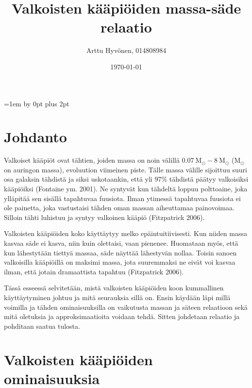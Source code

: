 \documentclass[12pt,a4paper,titlepage]{article}
\title{Valkoisten kääpiöiden massa-säde relaatio}
\author{\begin{tabular}{c}
Arttu Hyvönen, 014808984
\end{tabular}}
\date{\today}
\begin{document}
\maketitle
{}

\restoregeometry

\thispagestyle{empty}
\tableofcontents
\newpage
\setcounter{page}{1}
\parskip=1em \advance\parskip by 0pt plus 2pt
\pagestyle{fancy}


\section{Johdanto}

Valkoiset kääpiöt ovat tähtien, joiden massa on noin välillä $0.07\: \mathrm{M_{\odot}} -8\: \mathrm{M_{\odot}}$ ($\mathrm{M}_{\odot}$ on auringon massa), evoluution viimeinen piste. Tälle massa välille sijoittuu suuri osa galaksin tähdistä ja siksi uskotaankin, että yli 97\% tähdistä päätyy valkoisiksi kääpiöiksi (Fontaine ym. 2001). Ne syntyvät kun tähdeltä loppuu polttoaine, joka ylläpitää sen sisällä tapahtuvaa fuusiota. Ilman ytimessä tapahtuvaa fuusiota ei ole painetta, joka vastustaisi tähden oman massan aiheuttamaa painovoimaa. Silloin tähti luhistuu ja syntyy valkoinen kääpiö (Fitzpatrick 2006). 

Valkoisten kääpiöiden koko käyttäytyy melko epäintuitiivisesti. Kun niiden massa kasvaa säde ei kasva, niin kuin olettaisi, vaan pienenee. Huomataan myös, että kun lähestytään tiettyä massaa, säde näyttää lähestyvän nollaa. Toisin sanoen valkoisilla kääpiöillä on maksimi massa, jota suuremmaksi ne eivät voi kasvaa ilman, että jotain dramaattista tapahtuu (Fitzpatrick 2006).

Tässä esseessä selvitetään, mistä valkoisten kääpiöiden koon kummallinen käyttäytyminen johtuu ja mitä seurauksia sillä on. Ensin käydään läpi millä voimilla ja tähden ominaisuuksilla on vaikutusta massan ja säteen relaatioon sekä mitä oletuksia ja approksimaatioita voidaan tehdä. Sitten johdetaan relaatio ja pohditaan saatua tulosta.\\


\section{Valkoisten kääpiöiden ominaisuuksia}
\end{document}
